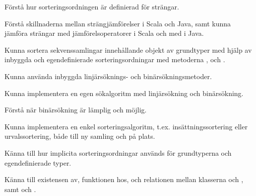 

\ifPreSolution

\Exercise{\ExeWeekTWELVE}\label{exe:W12}

\begin{Goals}
\item Förstå hur sorteringsordningen är definierad för strängar.
\item Förstå skillnaderna mellan strängjämförelser i Scala och Java, samt kunna jämföra strängar med jämförelsoperatorer i Scala och med  i Java.
\item Kunna sortera sekvenssamlingar innehållande objekt av grundtyper med hjälp av inbyggda och egendefinierade sorteringsordningar med metoderna ,  och .
\item Kunna använda inbyggda linjärsöknings- och binärsökningsmetoder.
\item Kunna implementera en egen sökalgoritm med linjärsökning och binärsökning.
\item Förstå när binärsökning är lämplig och möjlig.
\item Kunna implementera en enkel sorteringsalgoritm, t.ex. insättningssortering eller urvalssortering, både till ny samling och på plats.
\item Känna till hur implicita sorteringsordningar används för grundtyperna och egendefinierade typer.
\item Känna till existensen av, funktionen hos, och relationen mellan klasserna  och , samt   och .
\end{Goals}


\BasicTasks %

\else

\ExerciseSolution{\ExeWeekTWELVE}

\BasicTasks

\fi






\QUESTBEGIN

